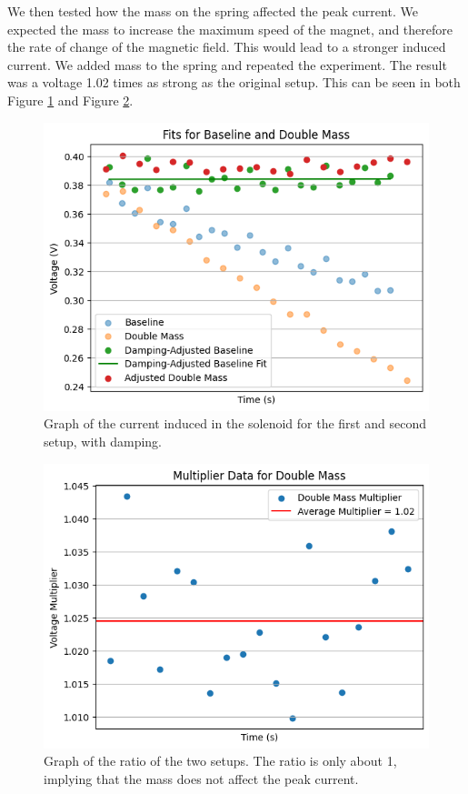 \documentclass[11pt]{article}
\begin{document}
    We then tested how the mass on the spring affected the peak current.
    We expected the mass to increase the maximum speed of the magnet, and therefore the rate of change of the magnetic field.
    This would lead to a stronger induced current.
    We added mass to the spring and repeated the experiment.
    The result was a voltage 1.02 times as strong as the original setup.
    This can be seen in both Figure \ref{fig:part1b_damping} and Figure \ref{fig:part1b_ratios}.

    \begin{figure}[H]
        \centering
        \includegraphics[width=0.8\linewidth]{resources/images/part1b damping}
        \caption{Graph of the current induced in the solenoid for the first and second setup, with damping.}
        \label{fig:part1b_damping}
    \end{figure}

    \begin{figure}[H]
        \centering
        \includegraphics[width=0.8\linewidth]{resources/images/part1b ratios}
        \caption{Graph of the ratio of the two setups. The ratio is only about 1, implying that the mass does not affect the peak current.}
        \label{fig:part1b_ratios}
    \end{figure}
\end{document}
